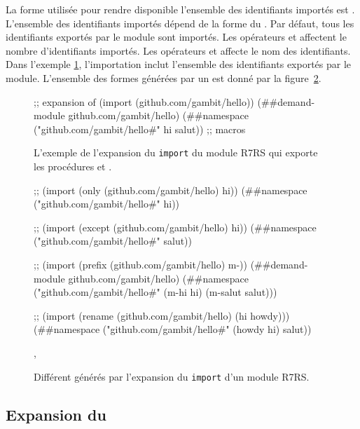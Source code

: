 La forme utilisée pour rendre disponible l'ensemble des identifiants importés
est . L'ensemble des identifiants importés dépend de la
forme du . Par défaut, tous les identifiants exportés par le
module sont importés.  Les opérateurs  et 
affectent le nombre d'identifiants importés. Les opérateurs  et
 affecte le nom des identifiants.  Dans l'exemple
\ref{fig:import->expand-r7rs}, l'importation inclut l'ensemble des identifiants
exportés par le module. L'ensemble des formes  générées par
un  est donné par la
figure~\ref{fig:import->expand-r7rs-namespace}.
\\

\begin{figure}[ht]
  \centering
  \begin{mplisting}{1}
;; expansion of (import (github.com/gambit/hello))
(##demand-module github.com/gambit/hello)
(##namespace ("github.com/gambit/hello#" hi salut))
;; macros
\end{mplisting}
  \caption{L'exemple de l'expansion du \texttt{import} du module R7RS
     qui exporte les procédures
     et .}
  \label{fig:import->expand-r7rs}
\end{figure}


\begin{figure}[ht]
  \centering
  \begin{mplisting}{1}
;; (import (only (github.com/gambit/hello) hi))
(##namespace ("github.com/gambit/hello#" hi))

;; (import (except (github.com/gambit/hello) hi))
(##namespace ("github.com/gambit/hello#" salut))

;; (import (prefix (github.com/gambit/hello) m-))
(##demand-module github.com/gambit/hello)
(##namespace ("github.com/gambit/hello#" (m-hi hi) (m-salut salut)))

;; (import (rename (github.com/gambit/hello) (hi howdy)))
(##namespace ("github.com/gambit/hello#" (howdy hi) salut))
\end{mplisting}
  \caption{Différent  générés par
    l'expansion du \texttt{import} d'un module R7RS.}
  \label{fig:import->expand-r7rs-namespace},
\end{figure}


\subsection{Expansion du }

